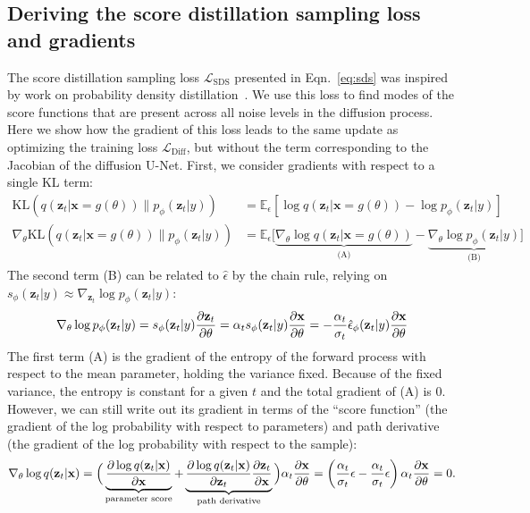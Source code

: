 \documentclass{article} %
\newcommand{\x}[0]{\mathbf{x}}
\newcommand{\z}[0]{\mathbf{z}}
\newcommand{\zt}[0]{{\z}_t}
\newcommand{\ldiff}[0]{\mathcal{L}_{\text{Diff}}}
\newcommand{\ldist}[0]{\mathcal{L}_{\text{SDS}}}
\begin{document}
\subsection{Deriving the score distillation sampling loss and gradients}
\label{sec:appendix:vos_math}
The score distillation sampling loss $\ldist$ presented in Eqn.~\ref{eq:sds} was inspired by work on probability density distillation~\citep{Huang2019ProbabilityDA, Ping2019ClariNetPW, Oord2018ParallelWF}. We use this loss to find modes of the score functions that are present across all noise levels in the diffusion process. %
Here we show how the gradient of this loss leads to the same update as optimizing the training loss $\ldiff$, but without the term corresponding to the Jacobian of the diffusion U-Net. First, we consider gradients with respect to a single KL term:
\begin{align}
    \text{KL}(q(\zt|\x=g(\theta)) \|  p_\phi(\zt | y)) &= %
    \mathbb{E}_\epsilon\left[\log q(\zt | \x=g(\theta)) - \log p_\phi(\zt|y)\right]\\
    \nabla_\theta \text{KL}(q(\zt|\x=g(\theta)) \|  p_\phi(\zt | y)) &= %
    \mathbb{E}_\epsilon\Big[\underbrace{\nabla_\theta \log q(\zt | \x=g(\theta))}_{\text{(A)}} - \underbrace{\nabla_\theta\log p_\phi(\zt|y)}_{\text{(B)}}\Big]
\end{align}
The second term (B) can be related to $\hat\epsilon$ by the chain rule, relying on $s_\phi(\zt | y) \approx \nabla_{\zt} \log p_\phi(\zt | y)$:
\begin{align}
    \nabla_\theta \log p_\phi(\zt|y) =  s_\phi(\zt|y){\partial \zt \over \partial \theta} =  \alpha_t s_\phi(\zt|y){\partial \x \over \partial \theta} = -\frac{\alpha_t }{\sigma_t}\hat\epsilon_\phi(\zt | y) {\partial \x \over \partial \theta} \label{eq:nonstickinggrad}
\end{align}
The first term (A) is the gradient of the entropy of the forward process with respect to the mean parameter, holding the variance fixed. Because of the fixed variance, the entropy is constant for a given $t$ and the total gradient of (A) is 0. However, we can still write out its gradient in terms of the ``score function'' (the gradient of the log probability with respect to parameters) and path derivative (the gradient of the log probability with respect to the sample):
\begin{align}
\nabla_{\theta} \log q(\zt|\x) = \Big(
    \underbrace{{\partial \log q(\zt | \x) \over \partial \x }}_{\text{parameter score}} +
    \underbrace{{\partial \log q(\zt|\x) \over \partial \zt }{\partial \zt \over \partial \x}}_{\text{path derivative}}
\Big)\alpha_t {\partial \x \over \partial \theta} = \left(\frac{\alpha_t}{\sigma_t}\epsilon - \frac{\alpha_t}{\sigma_t}\epsilon\right) \alpha_t {\partial \x \over \partial \theta}=0. \label{eq:sticking}
\end{align}
\end{document}
